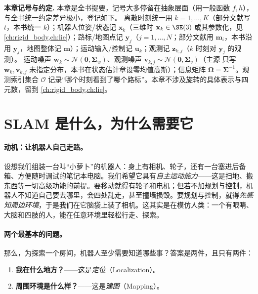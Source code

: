 \begin{note}
\textbf{本章记号与约定.}\;
本章是全书提要，记号大多停留在抽象层面（用一般函数 $f,h$），与全书统一约定差异极小，登记如下。
离散时刻统一用 $k=1,\dots,K$（部分文献写 $t$，本书统一 $k$）；机器人位姿/状态记 $\mathbf{x}_k$（三维时 $\mathbf{x}_k\in\SE(3)$ 或其参数化，见 \cref{ch:rigid_body,ch:lie}）；路标/地图点记 $\mathbf{y}_j$（$j=1,\dots,N$；部分文献用 $\mathbf{m}_i$，本书沿用 $\mathbf{y}_j$，地图整体记 $\mathbf{m}$）；运动输入/控制记 $\mathbf{u}_k$；观测记 $\mathbf{z}_{k,j}$（$k$ 时刻对 $\mathbf{y}_j$ 的观测）。
运动噪声 $\mathbf{w}_k\sim\mathcal{N}(\mathbf{0},\boldsymbol{\Sigma}_w)$、观测噪声 $\mathbf{v}_{k,j}\sim\mathcal{N}(\mathbf{0},\boldsymbol{\Sigma}_v)$（主源\cite{gaoxiang2019slam14} 只写 $\mathbf{w}_k,\mathbf{v}_{k,j}$ 未指定分布，本书在状态估计章设零均值高斯）；信息矩阵 $\boldsymbol{\Omega}=\boldsymbol{\Sigma}^{-1}$。观测索引集合 $\mathcal{O}$ 记录“哪个时刻看到了哪个路标”。本章不涉及旋转的具体表示与四元数，留到 \cref{ch:rigid_body,ch:lie}。
\end{note}

\section{SLAM 是什么，为什么需要它}
\label{sec:intro-what}

\paragraph{动机：让机器人自己走路。}
设想我们组装一台叫“小萝卜”的机器人\cite{gaoxiang2019slam14}：身上有相机、轮子，还有一台塞进后备箱、方便随时调试的笔记本电脑。我们希望它具有\emph{自主运动能力}——这是扫地、搬东西等一切高级功能的前提。要移动就得有轮子和电机；但若不加规划与控制，机器人不知道自己要去哪里，会四处乱走，甚至撞墙损毁。要规划与控制，就得\emph{先感知周边环境}，于是我们在它脑袋上装了相机。这其实是在模仿人类：一个有眼睛、大脑和四肢的人，能在任意环境里轻松行走、探索。

\paragraph{两个最基本的问题。}
那么，为探索一个房间，机器人至少需要知道哪些事？答案是两件，且只有两件\cite{gaoxiang2019slam14}：

\begin{enumerate}
  \item \textbf{我在什么地方？}——这是\emph{定位}（Localization）。
  \item \textbf{周围环境是什么样？}——这是\emph{建图}（Mapping）。
\end{enumerate}

